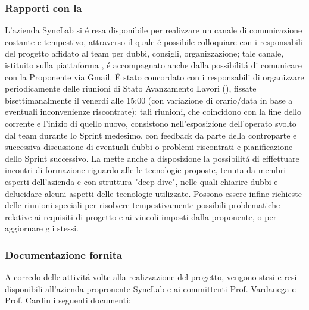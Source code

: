 \subsubsection{Rapporti con la }
L'azienda SyncLab si é resa disponibile per realizzare un canale di comunicazione costante e tempestivo, attraverso il quale é possibile colloquiare con i responsabili del progetto affidato al team per dubbi, consigli, organizzazione; tale canale, istituito sulla piattaforma , é accompagnato anche dalla possibilitá di comunicare con la Proponente via Gmail. É stato concordato con i responsabili di organizzare periodicamente delle riunioni di Stato Avanzamento Lavori (), fissate bisettimanalmente il venerdí alle 15:00 (con variazione di orario/data in base a eventuali inconvenienze riscontrate): tali riunioni, che coincidono con la fine dello  corrente e l'inizio di quello nuovo, consistono nell'esposizione dell'operato svolto dal team durante lo Sprint medesimo, con feedback da parte della controparte e successiva discussione di eventuali dubbi o problemi riscontrati e pianificazione dello Sprint successivo.
La  mette anche a disposizione la possibilitá di efffettuare incontri di formazione riguardo alle le tecnologie proposte, tenuta da membri esperti dell'azienda e con struttura "deep dive", nelle quali chiarire dubbi e delucidare alcuni aspetti delle tecnologie utilizzate. 
Possono essere infine richieste delle riunioni speciali per risolvere tempestivamente possibili problematiche relative ai requisiti di progetto e ai vincoli imposti dalla proponente, o per aggiornare gli stessi.

\subsubsection{Documentazione fornita}
A corredo delle attivitá volte alla realizzazione del progetto, vengono stesi e resi disponibili all'azienda propronente SyncLab e ai committenti Prof. Vardanega e Prof. Cardin i seguenti documenti:

